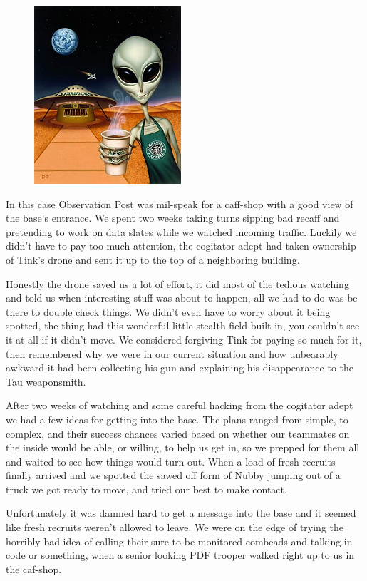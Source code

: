 \begin{figure}
	\begin{center}
		\includegraphics[width=\figwidth]{pics/10/43.png}
	\end{center}
\end{figure}
In this case Observation Post was mil-speak for a caff-shop with a good view of the base's entrance. 
We spent two weeks taking turns sipping bad recaff and pretending to work on data slates while we watched incoming traffic. 
Luckily we didn't have to pay too much attention, the cogitator adept had taken ownership of Tink's drone and sent it up to the top of a neighboring building. 


Honestly the drone saved us a lot of effort, it did most of the tedious watching and told us when interesting stuff was about to happen, all we had to do was be there to double check things. 
We didn't even have to worry about it being spotted, the thing had this wonderful little stealth field built in, you couldn't see it at all if it didn't move. 
We considered forgiving Tink for paying so much for it, then remembered why we were in our current situation and how unbearably awkward it had been collecting his gun and explaining his disappearance to the Tau weaponsmith.

After two weeks of watching and some careful hacking from the cogitator adept we had a few ideas for getting into the base. 
The plans ranged from simple, to complex, and their success chances varied based on whether our teammates on the inside would be able, or willing, to help us get in, so we prepped for them all and waited to see how things would turn out. 
When a load of fresh recruits finally arrived and we spotted the sawed off form of Nubby jumping out of a truck we got ready to move, and tried our best to make contact.

Unfortunately it was damned hard to get a message into the base and it seemed like fresh recruits weren't allowed to leave. 
We were on the edge of trying the horribly bad idea of calling their sure-to-be-monitored combeads and talking in code or something, when a senior looking PDF trooper walked right up to us in the caf-shop. 



